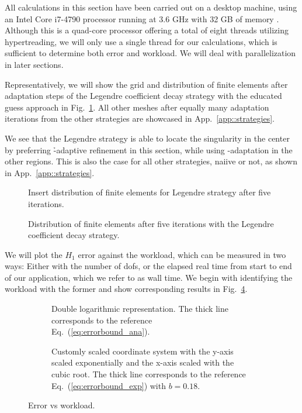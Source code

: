 All calculations in this section have been carried out on a desktop machine, using an Intel  Core i7-4790 processor running at 3.6 GHz with 32 GB of memory . Although this is a quad-core processor offering a total of eight threads utilizing hypertreading, we will only use a single thread for our calculations, which is sufficient to determine both error and workload. We will deal with parallelization in later sections.



Representatively, we will show the grid and distribution of finite elements after  adaptation steps of the Legendre coefficient decay strategy with the educated guess approach in Fig.~\ref{fig:fedegrees}. All other meshes after equally many adaptation iterations from the other strategies are showcased in App.~\ref{app::strategies}.

We see that the Legendre strategy is able to locate the singularity in the center by preferring \h-adaptive refinement in this section, while using \p-adaptation in the other regions. This is also the case for all other strategies, naiive or not, as shown in App.~\ref{app::strategies}.

\begin{figure}
\centering
Insert distribution of finite elements for Legendre strategy after five iterations.
\caption{Distribution of finite elements after five iterations with the Legendre coefficient decay strategy.}
\label{fig:fedegrees}
\end{figure}

We will plot the $H_1$ error against the workload, which can be measured in two ways: Either with the number of \glspl{dof}, or the elapsed real time from start to end of our application, which we refer to as wall time. We begin with identifying the workload with the former and show corresponding results in Fig.~\ref{fig:errordofs}.


\begin{figure}
\begin{subfigure}{1\textwidth}
  \centering
  
  \caption{Double logarithmic representation. The thick line corresponds to the reference Eq.~(\ref{eq:errorbound_ana}).}
  \label{fig:errordofsloglog}
\end{subfigure}
\begin{subfigure}{1\textwidth}
  \centering
  
  \caption{Customly scaled coordinate system with the y-axis scaled exponentially and the x-axis scaled with the cubic root. The thick line corresponds to the reference Eq.~(\ref{eq:errorbound_exp}) with $b = 0.18$.}
  \label{fig:errordofscustom}
\end{subfigure}
\caption{Error vs workload.}
\label{fig:errordofs}
\end{figure}

